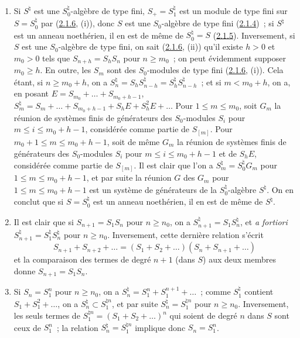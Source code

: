 \begin{enumerate}
\item[\rm(i)] Si $S^\natural$ est une $S_0^\natural$-algèbre de type fini,
$S_+=S_1^\natural$ est un module de type fini sur $S=S_0^\natural$ par
(\hyperref[II.2.1.6-fr]{2.1.6}, (i)), donc $S$ est une $S_0$-algèbre de type
fini (\hyperref[II.2.1.4-fr]{2.1.4})~; si $S^\natural$ est un anneau
noethérien, il en est de même de $S_0^\natural=S$
(\hyperref[II.2.1.5-fr]{2.1.5}). Inversement, si $S$ est une $S_0$-algèbre
de type fini, on sait (\hyperref[II.2.1.6-fr]{2.1.6}, (ii)) qu'il existe
$h>0$ et $m_0>0$ tels que $S_{n+h}=S_hS_n$ pour $n\geq m_0$~; on peut
évidemment supposer $m_0\geq h$. En outre, les $S_m$ sont des $S_0$-modules
de type fini (\hyperref[II.2.1.6-fr]{2.1.6}, (i)). Cela étant, si
$n\geq m_0+h$, on a $S_n^\natural=S_hS_{n-h}^\natural
=S_h^\natural S_{n-h}^\natural$~; et si $m<m_0+h$, on a, en posant
$E=S_{m_0}+\ldots+S_{m_0+h-1}$,
$S_m^\natural=S_m+\ldots+S_{m_0+h-1}+S_hE+S_h^2E+\ldots$
Pour $1\leq m\leq m_0$, soit $G_m$ la réunion de systèmes finis de
générateurs des $S_0$-modules $S_i$ pour $m\leq i\leq m_0+h-1$,
considérée comme partie de $S_{[m]}$. Pour $m_0+1\leq m\leq m_0+h-1$, soit
de même $G_m$ la réunion de systèmes finis de générateurs des $S_0$-modules
$S_i$ pour $m\leq i\leq m_0+h-1$ et de $S_hE$, considérée comme partie de
$S_{[m]}$. Il est clair que l'on a $S_m^\natural=S_0^\natural G_m$ pour
$1\leq m\leq m_0+h-1$, et par suite la réunion $G$ des $G_m$ pour
$1\leq m\leq m_0+h-1$ est un système de générateurs de la
$S_0^\natural$-algèbre $S^\natural$. On en conclut que si $S=S_0^\natural$
est un anneau noethérien, il en est de même de $S^\natural$.

\item[\rm(ii)] Il est clair que si $S_{n+1}=S_1S_n$ pour $n\geq n_0$, on a
$S_{n+1}^\natural=S_1S_n^\natural$, et \emph{a fortiori}
$S_{n+1}^\natural=S_1^\natural S_n^\natural$ pour $n\geq n_0$.
Inversement, cette dernière relation s'écrit
\[
  S_{n+1}+S_{n+2}+\ldots=(S_1+S_2+\ldots)(S_n+S_{n+1}+\ldots)
\]
et la comparaison des termes de degré $n+1$ (dans $S$) aux deux membres donne
$S_{n+1}=S_1S_n$.

\item[\rm(iii)] Si $S_n=S_1^n$ pour $n\geq n_0$, on a
$S_n^\natural=S_1^n+S_1^{n+1}+\ldots$~; comme $S_1^\natural$ contient
$S_1+S_1^2+\ldots$, on a $S_n^\natural\subset S_1^{\natural n}$, et par suite
$S_n^\natural=S_1^{\natural n}$ pour $n\geq n_0$. Inversement, les seuls
termes de $S_1^{\natural n}=(S_1+S_2+\ldots)^n$ qui soient de degré $n$ dans
$S$ sont ceux de $S_1^n$~; la relation $S_n^\natural=S_1^{\natural n}$
implique donc $S_n=S_1^n$.


\end{enumerate}
